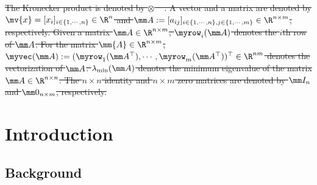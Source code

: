 \documentclass[letterpaper, journal]{IEEEtran}
\providecommand{\DIFdel}[1]{{\protect\color{red}\sout{#1}}} %
\providecommand{\DIFdelend}{} %
\begin{document}
\DIFdel{The Kronecker product is denoted by $\otimes$ \mbox{%
\cite[Chap. 7, Def. 7.1.2]{Bernstein:2009aa}}\hskip0pt%
.
A vector and a matrix are denoted by $\mv{x}=[x_i]_{i\in\{1,\cdots,n\}}\in\R^n$ and $
\mm A
:= 
[a_{ij}]
_{
    i\in\{1,\cdots,n\},j\in\{1,\cdots ,m\}
}\allowbreak\in\R^{n\times m}
$, respectively.
Given a matrix $\mm A\in\R^{n\times m}$, $\myrow_i(\mm A)$ denotes the $i$th row of $\mm A$. 
For the matrix $\mm{A}\in\R^{n\times m}$, $\myvec(\mm A):=(\myrow_1(\mm A^\top),\cdots,\myrow_m(\mm A^\top) )^\top\in\R^{nm}$ denotes the vectorization of $\mm A$.
$\lambda_{\min}(\mm A)$ denotes the minimum eigenvalue of the matrix $\mm A\in\R^{n\times n}$.
The $n\times n$ identity and $n\times m$ zero matrices are denoted by $\mm I_n$ and $\mm 0_{n\times m}$, respectively.
}%

\DIFdelend %
\section{Introduction}

\subsection{Background}
\end{document}
